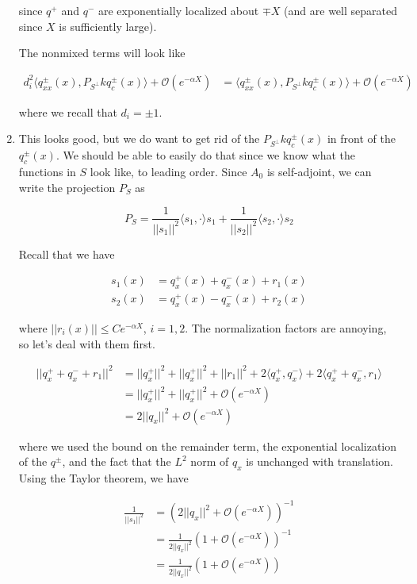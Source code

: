 \documentclass[12pt]{article}
\begin{document}
\begin{enumerate}
since $q^+$ and $q^-$ are exponentially localized about $\mp X$ (and are well separated since $X$ is sufficiently large).

The nonmixed terms will look like 

\begin{align*}
d_i^2 \langle q^\pm_{xx}(x), P_{S^\perp} k q^\pm_c(x) \rangle + \mathcal{O}(e^{-\alpha X}) 
&= \langle q^\pm_{xx}(x), P_{S^\perp} k q^\pm_c(x) \rangle + \mathcal{O}(e^{-\alpha X}) 
\end{align*}

where we recall that $d_i = \pm 1$.

\item This looks good, but we do want to get rid of the $P_{S^\perp} k q^\pm_c(x)$ in front of the $q^\pm_c(x)$. We should be able to easily do that since we know what the functions in $S$ look like, to leading order. Since $A_0$ is self-adjoint, we can write the projection $P_S$ as

\[
P_S = \frac{1}{||s_1||^2} \langle s_1, \cdot \rangle s_1 + \frac{1}{||s_2||^2} \langle s_2, \cdot \rangle s_2
\] 

Recall that we have

\begin{align*}
s_1(x) &= q^+_x(x) + q^-_x(x) + r_1(x) \\
s_2(x) &= q^+_x(x) - q^-_x(x) + r_2(x) 
\end{align*}

where $||r_i(x)|| \leq C e^{-\alpha X}$, $i = 1, 2$. The normalization factors are annoying, so let's deal with them first. 

\begin{align*}
||q^+_x + q^-_x + r_1||^2 &= ||q^+_x||^2 + ||q^+_x||^2 + ||r_1||^2 + 2\langle q^+_x, q^-_x \rangle 
+ 2 \langle q^+_x + q^-_x, r_1 \rangle \\
&= ||q^+_x||^2 + ||q^+_x||^2 + \mathcal{O}(e^{-\alpha X}) \\
&= 2 ||q_x||^2 + \mathcal{O}(e^{-\alpha X})
\end{align*}

where we used the bound on the remainder term, the exponential localization of the $q^\pm$, and the fact that the $L^2$ norm of $q_x$ is unchanged with translation. Using the Taylor theorem, we have

\begin{align*}
\frac{1}{||s_1||^2} &= (2 ||q_x||^2 + \mathcal{O}(e^{-\alpha X}))^{-1} \\
&= \frac{1}{2 ||q_x||^2}(1 + \mathcal{O}(e^{-\alpha X}))^{-1} \\
&= \frac{1}{2 ||q_x||^2}(1 + \mathcal{O}(e^{-\alpha X}))
\end{align*}


\end{enumerate}
\end{document}
